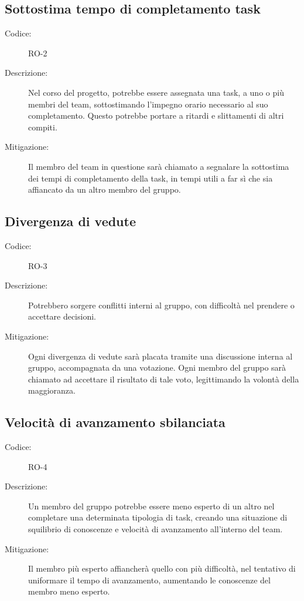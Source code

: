 \subsection*{Sottostima tempo di completamento task}
\begin{description}
    \item[Codice:] RO-2
    \item[Descrizione:] Nel corso del progetto, potrebbe essere assegnata una task, a uno o più membri del team, sottostimando l'impegno orario necessario al suo completamento. Questo potrebbe portare a ritardi e slittamenti di altri compiti.
    \item[Mitigazione:] Il membro del team in questione sarà chiamato a segnalare la sottostima dei tempi di completamento della task, in tempi utili a far sì che sia affiancato da un altro membro del gruppo.
\end{description}

\subsection*{Divergenza di vedute}
\begin{description}
    \item[Codice:] RO-3
    \item[Descrizione:] Potrebbero sorgere conflitti interni al gruppo, con difficoltà nel prendere o accettare decisioni.
    \item[Mitigazione:] Ogni divergenza di vedute sarà placata tramite una discussione interna al gruppo, accompagnata da una votazione. Ogni membro del gruppo sarà chiamato ad accettare il risultato di tale voto, legittimando la volontà della maggioranza.
\end{description}

\subsection*{Velocità di avanzamento sbilanciata}
\begin{description}
    \item[Codice:] RO-4
    \item[Descrizione:] Un membro del gruppo potrebbe essere meno esperto di un altro nel completare una determinata tipologia di task, creando una situazione di squilibrio di conoscenze e velocità di avanzamento all'interno del team.
    \item[Mitigazione:] Il membro più esperto affiancherà quello con più difficoltà, nel tentativo di uniformare il tempo di avanzamento, aumentando le conoscenze del membro meno esperto.
\end{description}

